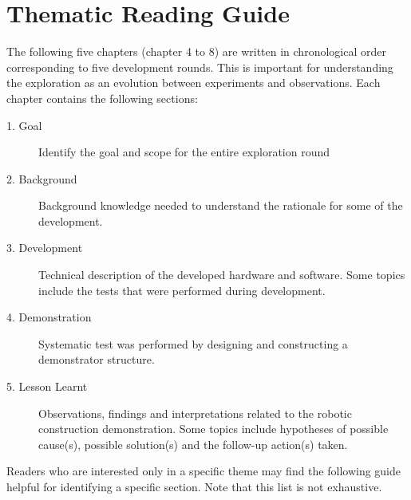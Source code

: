 \section{Thematic Reading Guide}
\label{section:methodology-thematic-reading-guide}

The following five chapters (chapter 4 to 8) are written in chronological order corresponding to five development rounds. This is important for understanding the exploration as an evolution between experiments and observations.  Each chapter contains the following sections:

\begin{description}
	\item [1. Goal] Identify the goal and scope for the entire exploration round
	\item [2. Background] Background knowledge needed to understand the rationale for some of the development.
	\item [3. Development] Technical description of the developed hardware and software. Some topics include the tests that were performed during development.	
    \item [4. Demonstration] Systematic test was performed by designing and constructing a demonstrator structure.
	\item [5. Lesson Learnt] Observations, findings and interpretations related to the robotic construction demonstration. Some topics include hypotheses of possible cause(s), possible solution(s) and the follow-up action(s) taken. 
\end{description}

Readers who are interested only in a specific theme may find the following guide helpful for identifying a specific section. Note that this list is not exhaustive. 

